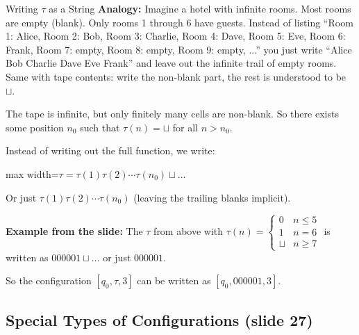 \documentclass[11pt,a4paper]{article}
\newcommand{\fitmath}[1]{\begin{adjustbox}{max width=\linewidth}$\displaystyle #1$\end{adjustbox}}
\begin{document}
\begin{notebox}{Writing $\tau$ as a String}
\textbf{Analogy:} Imagine a hotel with infinite rooms. Most rooms are empty (blank). Only rooms 1 through 6 have guests. Instead of listing ``Room 1: Alice, Room 2: Bob, Room 3: Charlie, Room 4: Dave, Room 5: Eve, Room 6: Frank, Room 7: empty, Room 8: empty, Room 9: empty, ...'' you just write ``Alice Bob Charlie Dave Eve Frank'' and leave out the infinite trail of empty rooms. Same with tape contents: write the non-blank part, the rest is understood to be $\sqcup$.

The tape is infinite, but only finitely many cells are non-blank. So there exists some position $n_0$ such that $\tau(n) = \sqcup$ for all $n > n_0$.

Instead of writing out the full function, we write:
\fitmath{\tau = \tau(1)\tau(2)\cdots\tau(n_0)\sqcup\ldots}

Or just $\tau(1)\tau(2)\cdots\tau(n_0)$ (leaving the trailing blanks implicit).

\textbf{Example from the slide:} The $\tau$ from above with $\tau(n) = \begin{cases} 0 & n \leq 5 \\ 1 & n = 6 \\ \sqcup & n \geq 7 \end{cases}$ is written as $000001\sqcup\ldots$ or just $000001$.

So the configuration $[q_0, \tau, 3]$ can be written as $[q_0, 000001, 3]$.
\end{notebox}

\subsection{Special Types of Configurations (slide 27)}
\end{document}

